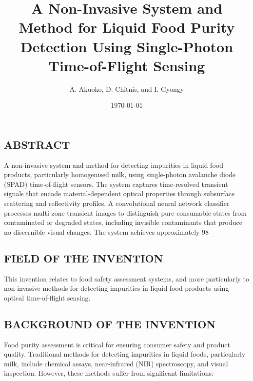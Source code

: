 \documentclass[11pt,a4paper]{article}
\title{A Non-Invasive System and Method for Liquid Food Purity Detection Using Single-Photon Time-of-Flight Sensing}
\author{A. Akuoko, D. Chitnis, and I. Gyongy}
\date{\today}
\begin{document}
\maketitle
\newpage

\subsection{ABSTRACT}

A non-invasive system and method for detecting impurities in liquid food products, particularly homogenised milk, using single-photon avalanche diode (SPAD) time-of-flight sensors. The system captures time-resolved transient signals that encode material-dependent optical properties through subsurface scattering and reflectivity profiles. A convolutional neural network classifier processes multi-zone transient images to distinguish pure consumable states from contaminated or degraded states, including invisible contaminants that produce no discernible visual changes. The system achieves approximately 98%

\vspace{0.5em}
\subsection{FIELD OF THE INVENTION}

This invention relates to food safety assessment systems, and more particularly to non-invasive methods for detecting impurities in liquid food products using optical time-of-flight sensing.

\vspace{0.5em}
\subsection{BACKGROUND OF THE INVENTION}

Food purity assessment is critical for ensuring consumer safety and product quality. Traditional methods for detecting impurities in liquid foods, particularly milk, include chemical assays, near-infrared (NIR) spectroscopy, and visual inspection. However, these methods suffer from significant limitations:
\end{document}
